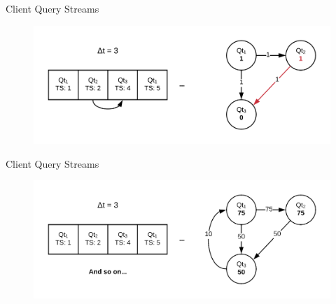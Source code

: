 \documentclass[10pt]{beamer}
\begin{document}
\begin{frame}[fragile]{Client Query Streams}
    \begin{figure}
        \includegraphics[scale=0.2]{apollo_client_query_stream_4}
    \end{figure}
\end{frame}

\begin{frame}[fragile]{Client Query Streams}
    \begin{figure}
        \includegraphics[scale=0.2]{apollo_client_query_stream_5}
    \end{figure}
\end{frame}
\end{document}

